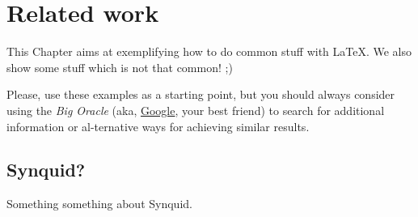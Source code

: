 
%

\makeatletter
\newcommand{\ntifpkgloaded}{%
  \@ifpackageloaded%
}
\makeatother


\chapter{Related work}
\label{cha:related_work}

This Chapter aims at exemplifying how to do common stuff with \LaTeX. We also show some stuff which is not that common! ;)

Please, use these examples as a starting point, but you should always consider using the \emph{Big Oracle} (aka, \href{http://www.google.com}{Google}, your best friend) to search for additional information or al-ternative ways for achieving similar results.

\section{Synquid?} 
\label{sec:synquid}

Something something about Synquid.
